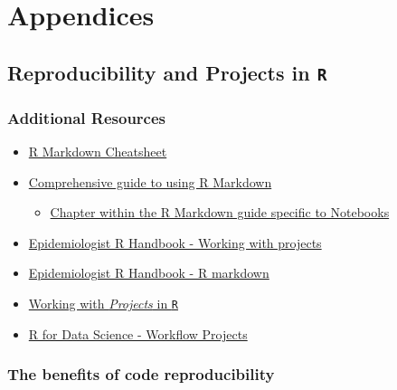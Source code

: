 \documentclass[
]{book}
\providecommand{\tightlist}{%
  \setlength{\itemsep}{0pt}\setlength{\parskip}{0pt}}
\begin{document}
\hypertarget{part-appendices}{%
\part{Appendices}\label{part-appendices}}

\hypertarget{reproducibility-and-projects-in-r}{%
\chapter{\texorpdfstring{Reproducibility and Projects in \texttt{R}}{Reproducibility and Projects in R}}\label{reproducibility-and-projects-in-r}}

\hypertarget{additional-resources-9}{%
\section*{Additional Resources}\label{additional-resources-9}}

\begin{itemize}
\tightlist
\item
  \href{https://github.com/rstudio/cheatsheets/raw/master/rmarkdown.pdf}{R Markdown Cheatsheet}
\item
  \href{https://bookdown.org/yihui/rmarkdown/}{Comprehensive guide to using R Markdown}

  \begin{itemize}
  \tightlist
  \item
    \href{https://bookdown.org/yihui/rmarkdown/notebook.html}{Chapter within the R Markdown guide specific to Notebooks}
  \end{itemize}
\item
  \href{https://epirhandbook.com/en/r-projects.html}{Epidemiologist R Handbook - Working with projects}
\item
  \href{https://epirhandbook.com/reports-with-r-markdown.html\#r-markdown-components}{Epidemiologist R Handbook - R markdown}
\item
  \href{https://support.rstudio.com/hc/en-us/articles/200526207-Using-Projects}{Working with \emph{Projects} in \texttt{R}}
\item
  \href{https://r4ds.had.co.nz/workflow-projects.html}{R for Data Science - Workflow Projects}
\end{itemize}

\hypertarget{the-benefits-of-code-reproducibility}{%
\section{The benefits of code reproducibility}\label{the-benefits-of-code-reproducibility}}
\end{document}
